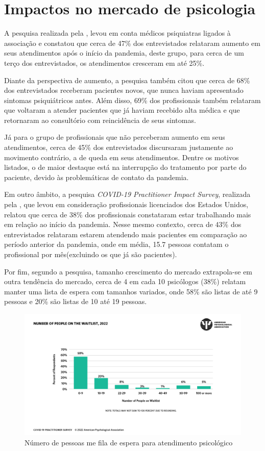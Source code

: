 \section{Impactos no mercado de psicologia}
\label{sec:impactoPsicologia}

A pesquisa realizada pela , levou em conta médicos psiquiatras ligados à associação e constatou que cerca de 47\% dos entrevistados relataram aumento em seus atendimentos após o início da pandemia, deste grupo, para cerca de um terço dos entrevistados, os atendimentos cresceram em até 25\%.

Diante da perspectiva de aumento, a pesquisa também citou que cerca de 68\% dos entrevistados receberam pacientes novos, que nunca haviam apresentado sintomas psiquiátricos antes. Além disso, 69\% dos profissionais também relataram que voltaram a atender pacientes que já haviam recebido alta médica e que retornaram ao consultório com reincidência de seus sintomas.

Já para o grupo de profissionais que não perceberam aumento em seus atendimentos, cerca de 45\% dos entrevistados discursaram justamente ao movimento contrário, a de queda em seus atendimentos. Dentre os motivos listados, o de maior destaque está na interrupção do tratamento por parte do paciente, devido às problemáticas de contato da pandemia.

Em outro âmbito, a pesquisa \textit{COVID-19 Practitioner Impact Survey}, realizada pela , que levou em consideração profissionais licenciados dos Estados Unidos, relatou que cerca de 38\% dos profissionais constataram estar trabalhando mais em relação ao início da pandemia. Nesse mesmo contexto, cerca de 43\% dos entrevistados relataram estarem atendendo mais pacientes em comparação ao período anterior da pandemia, onde em média, 15.7 pessoas contatam o profissional por mês(excluindo os que já são pacientes).

Por fim, segundo a pesquisa, tamanho crescimento do mercado extrapola-se em outra tendência do mercado, cerca de 4 em cada 10 psicólogos (38\%) relatam manter uma lista de espera com tamanhos variados, onde 58\% são listas de até 9 pessoas e 20\% são listas de 10 até 19 pessoas.

\begin{figure}[H]
    \centering
    \caption{Número de pessoas me fila de espera para atendimento psicológico}
    \label{fig:listaDeEspera}
    \includegraphics[width=.9\textwidth]{data/figures/lista-de-espera-psicologia.png}
\end{figure}